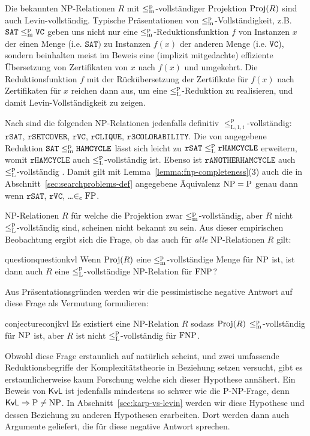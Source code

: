 Die \emph{}bekannten NP-Relationen $R$ mit $\leq_\mathrm{m}^\mathrm{p}$-vollständiger Projektion $\operatorname{Proj}(R)$ sind auch Levin-vollständig. Typische Präsentationen von $\leq_\mathrm{m}^\mathrm{p}$-Vollständigkeit, z.B. $\mathtt{SAT}\leq_\mathrm{m}^\mathrm{p} \mathtt{VC}$ geben uns nicht nur eine $\leq_\mathrm{m}^\mathrm{p}$-Reduktionsfunktion $f$ von Instanzen $x$ der einen Menge (i.e. $\mathtt{SAT})$ zu Instanzen $f(x)$ der anderen Menge (i.e. $\mathtt{VC}$), sondern beinhalten meist im Beweis eine (implizit mitgedachte) effiziente Übersetzung von Zertifikaten von $x$ nach $f(x)$ und umgekehrt. Die Reduktionsfunktion $f$ mit der Rückübersetzung der  Zertifikate für $f(x)$ nach Zertifikaten für $x$ reichen dann aus, um eine $\leq_\mathrm{L}^\mathrm{p}$-Reduktion zu realisieren, und damit Levin-Vollständigkeit zu zeigen.

Nach \textcite[104]{goldreich_computational_2008} sind die folgenden NP-Relationen jedenfalls definitiv $\leq_\mathrm{L,1,i}^\mathrm p$-vollständig: $\mathtt{rSAT}$, $\mathtt{rSETCOVER}$, $\mathtt{rVC}$, $\mathtt{rCLIQUE}$, $\mathtt{r3COLORABILITY}$.
Die von \textcite[193-198]{papadimitriou_computational_1994} angegebene Reduktion $\mathtt{SAT}\leq_\mathrm{m}^\mathrm{p}\mathtt{HAMCYCLE}$ lässt sich leicht zu $\mathtt{rSAT}\leq_\mathrm{L}^\mathrm{p}\mathtt{rHAMCYCLE}$ erweitern, womit $\mathtt{rHAMCYCLE}$ auch $\leq_\mathrm{L}^\mathrm{p}$-vollständig ist.
Ebenso ist $\mathtt{rANOTHERHAMCYCLE}$ auch $\leq_\mathrm{L}^\mathrm{p}$-vollständig \parencite*[232]{papadimitriou_computational_1994}. Damit gilt mit Lemma~\ref{lemma:fnp-completeness}(3) auch die in Abschnitt~\ref{sec:searchproblems-def} angegebene Äquivalenz $\mathrm{NP}=\mathrm{P}$ genau dann wenn $\mathtt{rSAT}$, $\mathtt{rVC}$, \dots $\in_\mathrm{c} \mathrm{FP}$.

NP-Relationen $R$ für welche die Projektion zwar $\leq_\mathrm{m}^\mathrm{p}$-vollständig, aber $R$ nicht $\leq_\mathrm{L}^\mathrm{p}$-vollständig sind, scheinen nicht bekannt zu sein.
Aus dieser empirischen Beobachtung ergibt sich die Frage, ob das auch für \emph{alle} NP-Relationen $R$ gilt: 
\begin{restatable}{question}{questionkvl}\label{question:kvl}
Wenn $\operatorname{Proj}(R)$ eine $\leq_\mathrm{m}^\mathrm{p}$-vollständige Menge für $\mathrm{NP}$ ist, ist dann auch $R$ eine $\leq_\mathrm{L}^\mathrm{p}$-vollständige NP-Relation für $\mathrm{FNP}$?
\end{restatable}
Aus Präsentationsgründen werden wir die pessimistische negative Antwort auf diese Frage als Vermutung formulieren:
\begin{restatable}{conjecture}{conjkvl}\label{conj:kvl}
    Es existiert eine NP-Relation $R$ sodass $\operatorname{Proj}(R)$ $\leq_\mathrm{m}^\mathrm{p}$-vollständig für $\mathrm{NP}$ ist, aber $R$ ist nicht $\leq_\mathrm{L}^\mathrm{p}$-vollständig für $\mathrm{FNP}$.
\end{restatable}
Obwohl diese Frage erstaunlich auf natürlich scheint, und zwei umfassende Reduktionsbegriffe der Komplexitätstheorie in Beziehung setzen versucht, gibt es erstaunlicherweise kaum Forschung welche sich dieser Hypothese annähert.
Ein Beweis von $\mathsf{KvL}$ ist jedenfalls mindestens so schwer wie die P-NP-Frage, denn $\mathsf{KvL}\Rightarrow \mathrm{P}\neq \mathrm{NP}$.
In Abschnitt~\ref{sec:karp-vs-levin} werden wir diese Hypothese und dessen Beziehung zu anderen Hypothesen erarbeiten. Dort werden dann auch Argumente geliefert, die für diese negative Antwort sprechen.

